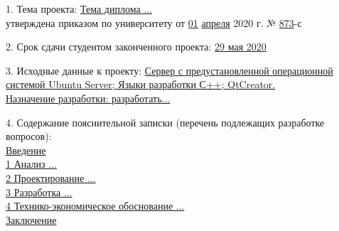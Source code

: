 {\begin{center}
  \end{center}

  1. Тема проекта: \uline{Тема диплома ...}\lineunderscore\\
  утверждена приказом по университету от \uline{01} \uline{апреля} 2020 г. № \uline{873}-с

  \vspace{1em}

  2. Срок сдачи студентом законченного проекта: \uline{29 мая 2020}\lineunderscore

  \vspace{1em}

  3. Исходные данные к проекту: 
  \uline{Сервер с предустановленной операционной систе\-мой Ubuntu Server; Языки разработки С++; QtCreator.}\lineunderscore\\
  \uline{\hspace*{4ex}
  Назначение разработки: разработать...}\lineunderscore

  \vspace{1em}


  4. Содержание пояснительной записки (перечень подлежащих разработке вопросов):
  \lineunderscore\\
  \uline{\hspace*{2ex}Введение}\lineunderscore\\
  \uline{\hspace*{2ex}1 Анализ ...}\lineunderscore\\
  \uline{\hspace*{2ex}2 Проектирование ...}\lineunderscore\\
  \uline{\hspace*{2ex}3 Разработка ...}\lineunderscore\\
  \uline{\hspace*{2ex}4 Технико-экономическое обоснование ...}\lineunderscore\\
  \uline{\hspace*{2ex}Заключение}\lineunderscore\\
  \lineunderscore\\
  \lineunderscore\\
  \lineunderscore\\
  \lineunderscore

}
